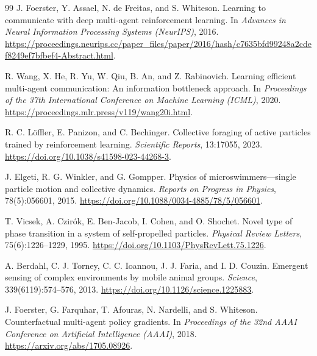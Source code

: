 \documentclass{article}
\begin{document}
\begin{thebibliography}{99}
J. Foerster, Y. Assael, N. de Freitas, and S. Whiteson.
\newblock Learning to communicate with deep multi-agent reinforcement learning.
\newblock In \emph{Advances in Neural Information Processing Systems (NeurIPS)},
2016.
\newblock \url{https://proceedings.neurips.cc/paper_files/paper/2016/hash/c7635bfd99248a2cdef8249ef7bfbef4-Abstract.html}.

R. Wang, X. He, R. Yu, W. Qiu, B. An, and Z. Rabinovich.
\newblock Learning efficient multi-agent communication: An information
bottleneck approach.
\newblock In \emph{Proceedings of the 37th International Conference on Machine
Learning (ICML)}, 2020.
\newblock \url{https://proceedings.mlr.press/v119/wang20i.html}.


R. C. L\"offler, E. Panizon, and C. Bechinger.
\newblock Collective foraging of active particles trained by reinforcement
learning.
\newblock \emph{Scientific Reports}, 13:17055, 2023.
\newblock \url{https://doi.org/10.1038/s41598-023-44268-3}.

J. Elgeti, R. G. Winkler, and G. Gompper.
\newblock Physics of microswimmers---single particle motion and collective
dynamics.
\newblock \emph{Reports on Progress in Physics}, 78(5):056601, 2015.
\newblock \url{https://doi.org/10.1088/0034-4885/78/5/056601}.

T. Vicsek, A. Czir\'ok, E. Ben-Jacob, I. Cohen, and O. Shochet.
\newblock Novel type of phase transition in a system of self-propelled
particles.
\newblock \emph{Physical Review Letters}, 75(6):1226--1229, 1995.
\newblock \url{https://doi.org/10.1103/PhysRevLett.75.1226}.

A. Berdahl, C. J. Torney, C. C. Ioannou, J. J. Faria, and I. D. Couzin.
\newblock Emergent sensing of complex environments by mobile animal groups.
\newblock \emph{Science}, 339(6119):574--576, 2013.
\newblock \url{https://doi.org/10.1126/science.1225883}.


J. Foerster, G. Farquhar, T. Afouras, N. Nardelli, and S. Whiteson.
\newblock Counterfactual multi-agent policy gradients.
\newblock In \emph{Proceedings of the 32nd AAAI Conference on Artificial
Intelligence (AAAI)}, 2018.
\newblock \url{https://arxiv.org/abs/1705.08926}.


\end{thebibliography}
\end{document}
